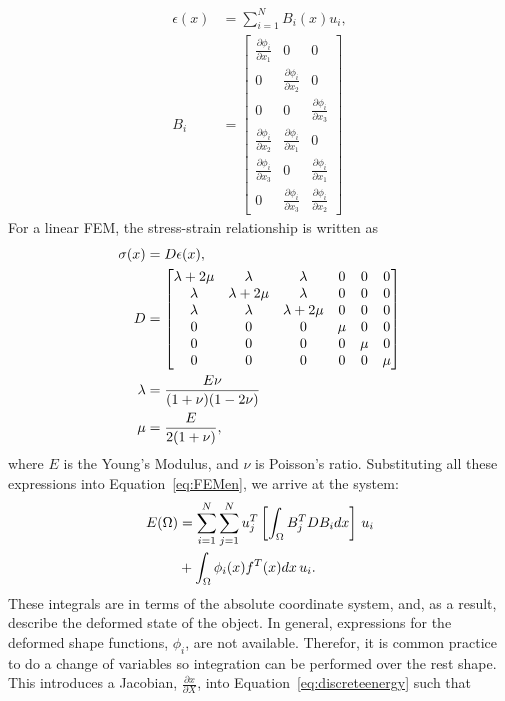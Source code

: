 \documentclass[journal]{IEEEtran}
\newcommand{\di}[2]{\frac{\partial#1}{\partial#2}}
\begin{document}
\begin{align}
  \epsilon(x) & = \sum_{i=1}^N B_i(x) u_i,\\
  B_i & = \begin{bmatrix}
	  \di{\phi_i}{x_1} & 0 & 0\\
	  0 & \di{\phi_i}{x_2} & 0\\
	  0 & 0 & \di{\phi_i}{x_3}\\
	  \di{\phi_i}{x_2} & \di{\phi_i}{x_1} & 0\\
	  \di{\phi_i}{x_3} & 0 & \di{\phi_i}{x_1}\\
	  0 & \di{\phi_i}{x_3} & \di{\phi_i}{x_2}
        \end{bmatrix}
\end{align}
For a linear FEM, the stress-strain relationship is written as
\begin{align}
  \sigma(x) & = D\epsilon(x),\\
  D & = \begin{bmatrix}
	  \lambda +2\mu & \lambda & \lambda  & 0 & 0 & 0\\
	  \lambda &  \lambda +2\mu & \lambda & 0 & 0 & 0\\
	  \lambda & \lambda & \lambda +2\mu & 0 & 0 & 0\\
	  0 & 0 & 0 & \mu & 0 & 0\\
	  0 & 0 & 0 & 0 & \mu & 0\\
	  0 & 0 & 0 & 0 & 0 & \mu
        \end{bmatrix}\label{eq:material}\\
  \lambda & = \dfrac{E\nu}{(1+\nu)(1-2\nu)} \notag\\
  \mu & = \dfrac{E}{2(1+\nu)}, \notag
\end{align}
where $E$ is the Young's Modulus, and $\nu$ is Poisson's ratio. Substituting all these expressions into Equation~\eqref{eq:FEMen}, we arrive at the system:
\begin{align} \label{eq:discreteenergy}
   E(\Omega) & = \sum_{i=1}^N\sum_{j=1}^N u_j^T \left[\int_\Omega B_j^TDB_i dx\right]\, u_i \notag\\
   &+ \int_\Omega \phi_i(x)f^T(x) dx\,u_i.
\end{align}
These integrals are in terms of the absolute coordinate system, and, as a result, describe the deformed state of the object. In general, expressions for the deformed shape functions, $\phi_i$, are not available. Therefor, it is common practice to do a change of variables so integration can be performed over the rest shape. This introduces a Jacobian, $\di{x}{X}$, into Equation~\eqref{eq:discreteenergy} such that
\end{document}
